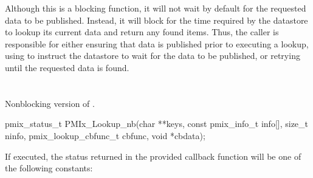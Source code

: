 \adviceuserstart
Although this is a blocking function, it will not wait by default for the requested data to be published.
Instead, it will block for the time required by the datastore to lookup its current data and return any found items.
Thus, the caller is responsible for either ensuring that data is published prior to executing a lookup, using  to instruct the datastore to wait for the data to be published, or retrying until the requested data is found.
\adviceuserend


\section{}

\summary

Nonblocking version of .

\format

\cspecificstart
\begin{codepar}
pmix_status_t
PMIx_Lookup_nb(char **keys,
               const pmix_info_t info[], size_t ninfo,
               pmix_lookup_cbfunc_t cbfunc, void *cbdata);
\end{codepar}
\cspecificend

\begin{arglist}
\end{arglist}

\returnsimple

If executed, the status returned in the provided callback function will be one of the following constants:

